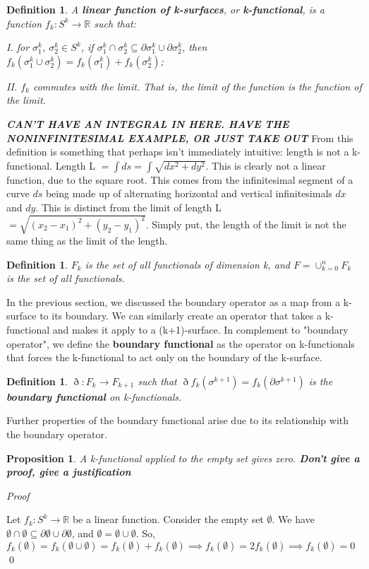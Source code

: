 \documentclass{book}
\newtheorem{defn}[equation]{Definition}
\newtheorem{prop}[equation]{Proposition}
\renewenvironment{proof}{\emph{Proof}}{\qed}
\begin{document}
\begin{defn}
	A \textbf{linear function of k-surfaces}, or \textbf{k-functional}, is a function $f_k : S^k \to \mathbb{R}$ such that:
	
	I. for $\sigma^k_1$, $\sigma^k_2 \in S^k$, if $\sigma^k_1 \cap \sigma^k_2 \subseteq \partial \sigma^k_1 \cup \partial \sigma^k_2$, then $f_k(\sigma^k_1\cup \sigma^k_2) = f_k(\sigma^k_1) + f_k(\sigma^k_2)$; 
	
	II. $f_k$ commutes with the limit. That is, the limit of the function is the function of the limit. 
\end{defn}

\textbf{\emph{CAN'T HAVE AN INTEGRAL IN HERE. HAVE THE NONINFINITESIMAL EXAMPLE, OR JUST TAKE OUT}}
From this definition is something that perhaps isn't immediately intuitive: length is not a k-functional. Length L $= \int ds = \int \sqrt{dx^2 + dy^2}$. This is clearly not a linear function, due to the square root. This comes from the infinitesimal segment of a curve $ds$ being made up of alternating horizontal and vertical infinitesimals $dx$ and $dy$. This is distinct from the limit of length L $= \sqrt{(x_2 - x_1)^2 + (y_2 - y_1)^2}$. Simply put, the length of the limit is not the same thing as the limit of the length. 


\begin{defn}
	$F_k$ is the set of all functionals of dimension k, and $F = \cup_{k=0}^nF_k$ is the set of all functionals. 
\end{defn}


In the previous section, we discussed the boundary operator as a map from a k-surface to its boundary. We can similarly create an operator that takes a k-functional and makes it apply to a (k+1)-surface. In complement to "boundary operator", we define the \textbf{boundary functional} as the operator on k-functionals that forces the k-functional to act only on the boundary of the k-surface. 

\begin{defn}
	$\eth : F_k \to F_{k+1}$ such that $\eth f_k(\sigma^{k+1}) = f_k(\partial \sigma^{k+1})$ is the \textbf{boundary functional} on k-functionals. 
\end{defn}

Further properties of the boundary functional arise due to its relationship with the boundary operator.


\begin{prop}
	A k-functional applied to the empty set gives zero. \textbf{\textit{Don't give a proof, give a justification}}
\end{prop}
\begin{proof}
	
	Let $f_k : S^k \to \mathbb{R}$ be a linear function. Consider the empty set $\emptyset$. 
We have $\emptyset \cap \emptyset \subseteq \partial\emptyset \cup \partial\emptyset$, and $\emptyset = \emptyset\cup\emptyset$. 
So, $f_k(\emptyset) = f_k(\emptyset\cup\emptyset) = f_k(\emptyset) + f_k(\emptyset) \implies f_k(\emptyset) = 2f_k(\emptyset) \implies f_k(\emptyset) = 0$
\end{proof}
\end{document}
